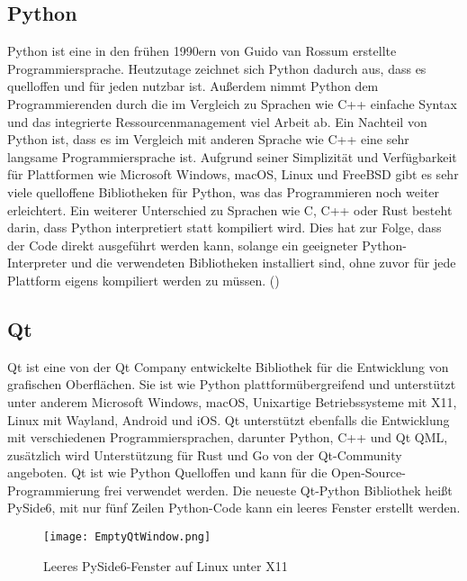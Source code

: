 \subsection{Python}
\label{subsec:tPython}
Python ist eine in den frühen 1990ern von Guido van Rossum erstellte Programmiersprache. Heutzutage zeichnet sich Python dadurch aus, dass es quelloffen und für jeden nutzbar ist. Außerdem nimmt Python dem Programmierenden durch die im Vergleich zu Sprachen wie C++ einfache Syntax und das integrierte Ressourcenmanagement viel Arbeit ab. Ein Nachteil von Python ist, dass es im Vergleich mit anderen Sprache wie C++ eine sehr langsame Programmiersprache ist. Aufgrund seiner Simplizität und Verfügbarkeit für Plattformen wie Microsoft Windows, macOS, Linux und FreeBSD gibt es sehr viele quelloffene Bibliotheken für Python, was das Programmieren noch weiter erleichtert. Ein weiterer Unterschied zu Sprachen wie C, C++ oder Rust besteht darin, dass Python interpretiert statt kompiliert wird. Dies hat zur Folge, dass der Code direkt ausgeführt werden kann, solange ein geeigneter Python-Interpreter und die verwendeten Bibliotheken installiert sind, ohne zuvor für jede Plattform eigens kompiliert werden zu müssen.
(\cite{matthes-2019})

\subsection{Qt}
\label{subsec:tQt}
Qt ist eine von der Qt Company entwickelte Bibliothek für die Entwicklung von grafischen Oberflächen. Sie ist wie Python plattformübergreifend und unterstützt unter anderem Microsoft Windows, macOS, Unixartige Betriebssysteme mit X11, Linux mit Wayland, Android und iOS. Qt unterstützt ebenfalls die Entwicklung mit verschiedenen Programmiersprachen, darunter Python, C++ und Qt QML, zusätzlich wird Unterstützung für Rust und Go von der Qt-Community angeboten. Qt ist wie Python Quelloffen und kann für die Open-Source-Programmierung frei verwendet werden. Die neueste Qt-Python Bibliothek heißt PySide6, mit nur fünf Zeilen Python-Code kann ein leeres Fenster erstellt werden.
\begin{figure}[h]
\centering
\texttt{[image: EmptyQtWindow.png]}
\caption{Leeres PySide6-Fenster auf Linux unter X11}
\label{fig:EmptyQtWindow}
\end{figure}